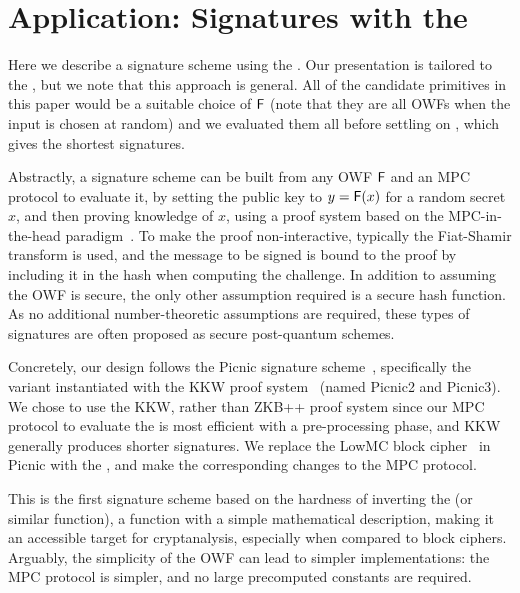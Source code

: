 
\newcommand{\secpar}{\kappa}
\newcommand{\bmat}[1]{\ensuremath{\mathbf{#1}}}
\newcommand{\matA}{\bmat{A}}
\newcommand{\matB}{\bmat{B}}

\section{Application: Signatures with the \ttOWF}
\label{sec:applications}

Here we describe a signature scheme using the \ttOWF. Our presentation is tailored to the \ttOWF, but we note that this approach is general.  All of the candidate primitives in this paper would be a suitable choice of $\mathsf{F}$ (note that they are all OWFs when the input is chosen at random) and we evaluated them all before settling on \ttOWF, which gives the shortest signatures.

Abstractly, a signature scheme can be built from any OWF $\mathsf{F}$ and an MPC protocol to evaluate it, by setting the public key to $y = \mathsf{F}(x)$ for a random secret $x$, and then proving knowledge of $x$, using a proof system based on the MPC-in-the-head paradigm~\cite{ishai2007-zkmpc}. To make the proof non-interactive, typically the Fiat-Shamir transform is used, and the message to be signed is bound to the proof by including it in the hash when computing the challenge. In addition to assuming the OWF is secure, the only other assumption required is a secure hash function. As no additional number-theoretic assumptions are required, these types of signatures are often proposed as secure post-quantum
schemes. 

Concretely, our design follows the Picnic signature scheme~\cite{chase2017-picnic}, specifically the variant instantiated with the KKW proof system~\cite{CCS:KatKolWan18} (named Picnic2 and Picnic3).  We chose to use the KKW, rather than ZKB++ proof system since our MPC protocol to evaluate the \ttOWF is most efficient with a pre-processing phase, and KKW generally produces shorter signatures.  We replace the LowMC block cipher~\cite{albrecht2015-lowmc} in Picnic with the \ttOWF, and make the corresponding changes to the MPC protocol. 

This is the first signature scheme based on the hardness of inverting the \ttOWF (or similar function), a function with a simple mathematical description, making it an accessible target for cryptanalysis, especially when compared to block ciphers.  Arguably, the simplicity of the OWF can lead to simpler implementations: the MPC protocol is simpler, and no large precomputed constants are required. 

